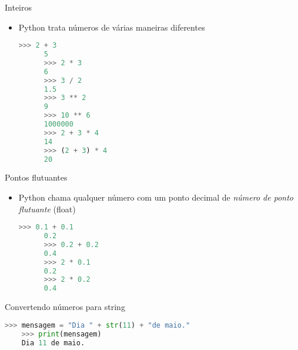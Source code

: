 \begin{frame}[t, fragile]{Inteiros}
  \begin{itemize}
    \item Python trata números de várias maneiras diferentes
    \begin{lstlisting}[language=python]
      >>> 2 + 3
      5
      >>> 2 * 3 
      6
      >>> 3 / 2
      1.5 
      >>> 3 ** 2 
      9
      >>> 10 ** 6
      1000000
      >>> 2 + 3 * 4 
      14
      >>> (2 + 3) * 4
      20
    \end{lstlisting}
  \end{itemize}
\end{frame}
%
\begin{frame}[t, fragile]{Pontos flutuantes}
  \begin{itemize}
    \item Python chama qualquer número com um ponto decimal de {\it número de ponto flutuante} (float)
    \begin{lstlisting}[language=python]
      >>> 0.1 + 0.1
      0.2
      >>> 0.2 + 0.2
      0.4
      >>> 2 * 0.1
      0.2 
      >>> 2 * 0.2
      0.4
    \end{lstlisting}
  \end{itemize}
\end{frame}
%
\begin{frame}[t, fragile]{Convertendo números para string}
  \begin{lstlisting}[language=python]
    >>> mensagem = "Dia " + str(11) + "de maio."
    >>> print(mensagem)
    Dia 11 de maio.
  \end{lstlisting}
\end{frame}

 

 